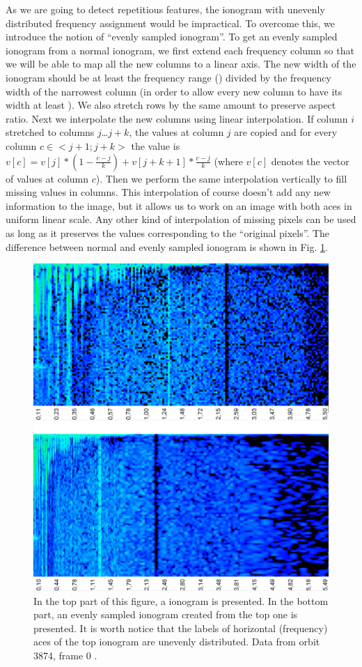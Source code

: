 As we are going to detect repetitious features, the ionogram with unevenly distributed frequency assignment would be impractical. To overcome this, we introduce the notion of ``evenly sampled ionogram''. To get an evenly sampled ionogram from a normal ionogram, we first extend each frequency column so that we will be able to map all the new columns to a linear axis. The new width of the ionogram should be at least the frequency range () divided by the frequency width of the narrowest column (in order to allow every new column to have its width at least ). We also stretch rows by the same amount to preserve aspect ratio. Next we interpolate the new columns using linear interpolation. If column $i$ stretched to columns $j$\ldots$j+k$, the values at column $j$ are copied and for every column $c\in<j+1; j+k>$ the value is $v[c] = v[j]*(1-\frac{c-j}{k}) + v[j+k+1]*\frac{c-j}{k}$ (where $v[c]$ denotes the vector of values at column $c$). Then we perform the same interpolation vertically to fill missing values in columns. This interpolation of course doesn't add any new information to the image, but it allows us to work on an image with both aces in uniform linear scale. Any other kind of interpolation of missing pixels can be used as long as it preserves the values corresponding to the ``original pixels''. The difference between normal and evenly sampled ionogram is shown in Fig. \ref{fig:even_uneven_iono}.

\begin{figure}
	\centering
	\includegraphics[width=140mm]{images/even_and_uneven_ionogram.png}
	\caption{In the top part of this figure, a ionogram is presented. In the bottom part, an evenly sampled ionogram created from the top one is presented. It is worth notice that the labels of horizontal (frequency) aces of the top ionogram are unevenly distributed. Data from orbit 3874, frame 0 \citep{FTP}.}
	\label{fig:even_uneven_iono}
\end{figure}

